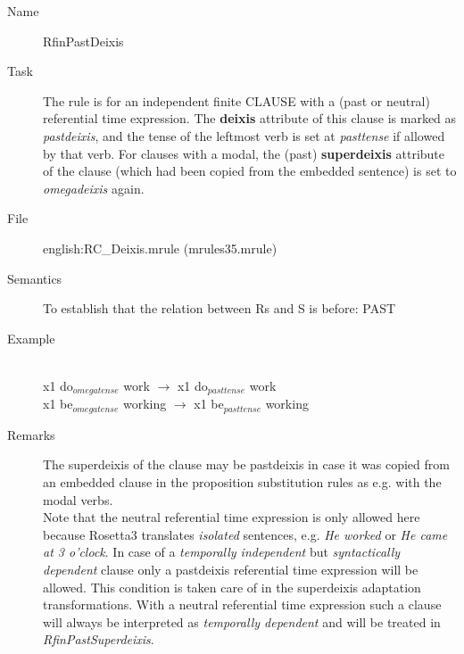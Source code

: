 \begin{description}
\vspace{1 cm}
\begin{description}
\item[Name] RfinPastDeixis
\item[Task] The rule is for an independent finite CLAUSE with a (past
or
neutral) referential time expression. The {\bf deixis} attribute of this clause
is marked as {\em pastdeixis\/}, and the tense of the leftmost verb is set
at {\em pasttense\/} if allowed by that verb. 
For clauses with a modal, the (past) {\bf superdeixis}
attribute of the clause (which had been copied from the embedded sentence) is 
set to {\em omegadeixis\/} again. 
\item[File] english:RC\_Deixis.mrule (mrules35.mrule)
\item[Semantics] To establish that the relation between Rs and S is 
before: PAST
\item[Example] \mbox{}\\
 x1 do$_{omegatense}$ work $\rightarrow$ x1 do$_{pasttense}$ work\\
 x1 be$_{omegatense}$ working $\rightarrow$ x1 be$_{pasttense}$ working
\item[Remarks] 
The superdeixis of the clause may be pastdeixis in 
case it was copied from an embedded clause in the proposition substitution 
rules as e.g. with the modal verbs. \\
Note that the neutral referential time expression is only allowed here because 
Rosetta3 translates {\em isolated} sentences, e.g. {\em He worked} or {\em He 
came at 3 o'clock}.
In case of a {\em temporally independent} but {\em syntactically dependent} 
clause only a pastdeixis referential time expression will be allowed. This 
condition is taken care of in the superdeixis adaptation transformations. With 
a neutral referential time expression such a clause will always be interpreted 
as {\em temporally dependent} and will be treated in {\em 
RfinPastSuperdeixis}.  

\end{description}


\end{description}
